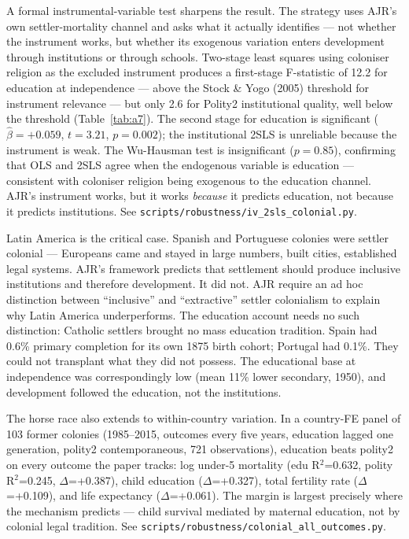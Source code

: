 \documentclass[12pt,letterpaper]{article}
\begin{document}
A formal instrumental-variable test sharpens the result. The strategy
uses AJR's own settler-mortality channel and asks what it actually
identifies --- not whether the instrument works, but whether its
exogenous variation enters development through institutions or through
schools.
Two-stage least squares using coloniser religion as the excluded
instrument produces a first-stage F-statistic of 12.2 for education at
independence --- above the Stock \& Yogo (2005) threshold for instrument
relevance --- but only 2.6 for Polity2 institutional quality, well below
the threshold (Table~\ref{tab:a7}). The second stage for education is
significant ($\hat\beta = +0.059$, $t = 3.21$, $p = 0.002$); the
institutional 2SLS is unreliable because the instrument is weak. The
Wu-Hausman test is insignificant ($p = 0.85$), confirming that OLS and
2SLS agree when the endogenous variable is education --- consistent with
coloniser religion being exogenous to the education channel.
AJR's instrument works, but it works \emph{because} it predicts
education, not because it predicts institutions.
See \texttt{scripts/robustness/iv\_2sls\_colonial.py}.

Latin America is the critical case. Spanish and Portuguese colonies were
settler colonial --- Europeans came and stayed in large numbers, built
cities, established legal systems. AJR's framework predicts that
settlement should produce inclusive institutions and therefore
development. It did not. AJR require an ad hoc distinction between
``inclusive'' and ``extractive'' settler colonialism to explain why Latin
America underperforms. The education account needs no such distinction:
Catholic settlers brought no mass education tradition. Spain had 0.6\%
primary completion for its own 1875 birth cohort; Portugal had 0.1\%.
They could not transplant what they did not possess. The educational
base at independence was correspondingly low (mean 11\% lower secondary,
1950), and development followed the education, not the institutions.

The horse race also extends to within-country variation. In a
country-FE panel of 103 former colonies (1985--2015, outcomes every
five years, education lagged one generation, polity2 contemporaneous,
721 observations), education beats polity2 on every outcome the
paper tracks: log under-5 mortality (edu R$^2$=0.632, polity
R$^2$=0.245, $\Delta$=+0.387), child education ($\Delta$=+0.327),
total fertility rate ($\Delta$=+0.109), and life expectancy
($\Delta$=+0.061). The margin is largest precisely where the
mechanism predicts --- child survival mediated by maternal
education, not by colonial legal tradition.
See \texttt{scripts/robustness/colonial\_all\_outcomes.py}.
\end{document}
